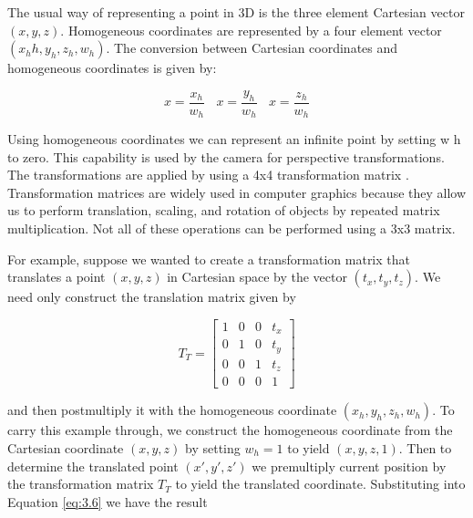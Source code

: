 The usual way of representing a point in 3D is the three element Cartesian vector $(x, y, z)$. Homogeneous coordinates are represented by a four element vector $( x_hh, y_h, z_h, w_h )$. The conversion between Cartesian coordinates and homogeneous coordinates is given by:

\begin{equation}\label{eq:3.5}
x = \frac{x_h}{w_h}\ \ \ \  x = \frac{y_h}{w_h}\ \ \ \ x = \frac{z_h}{w_h}
\end{equation}

Using homogeneous coordinates we can represent an infinite point by setting w h to zero. This capability is used by the camera for perspective transformations. The transformations are applied by using a 4x4 transformation matrix . Transformation matrices are widely used in computer graphics because they allow us to perform translation, scaling, and rotation of objects by repeated matrix multiplication. Not all of these operations can be performed using a 3x3 matrix.

For example, suppose we wanted to create a transformation matrix that translates a point $( x, y, z)$ in Cartesian space by the vector $( t_x , t_y, t_z)$. We need only construct the translation matrix given by

\begin{equation}\label{eq:3.6}
T_T = \left[\begin{array}{cccc}
1 & 0 & 0 & t_x       \\
0 & 1 & 0 & t_y      \\
0 & 0 & 1 & t_z      \\
0 & 0 & 0 & 1
\end{array}\right]
\end{equation}

and then postmultiply it with the homogeneous coordinate $(x_h, y_h, z_h, w_h)$. To carry this example through, we construct the homogeneous coordinate from the Cartesian coordinate $( x, y, z)$ by setting $w_h = 1$ to yield $(x, y, z, 1)$. Then to determine the translated point $(x' , y', z')$ we premultiply current position by the transformation matrix $T_T$ to yield the translated coordinate. Substituting into Equation \ref{eq:3.6} we have the result

